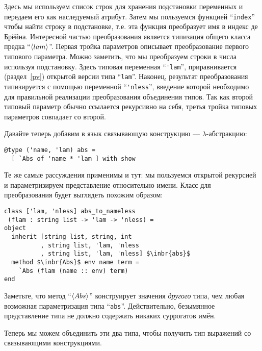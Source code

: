\noindent Здесь мы используем список строк для хранения подстановки переменных и  передаем его как наследуемый атрибут. Затем мы пользуемся функцией 
``\lstinline{index}'' чтобы найти строку в подстановке, т.е.  эта функция преобразует имя в индекс де Брёйна. 
Интересной частью преобразования является типизация общего класса предка ``$\left<lam\right>$''. 
Первая тройка параметров описывает преобразование первого типового параметра. Можно заметить, что мы преобразуем строки в числа используя подстановку.
Здесь типовая переменная ``\lstinline{'lam}'', 
приравнивается (раздел~\ref{pv}) открытой версии типа ``\lstinline{lam}''. %
Наконец, результат преобразования типизируется с помощью переменной ``\lstinline{'nless}'', введение которой необходимо для правильной реализации преобразования объединения типов.
Так как второй типовый параметр обычно ссылается рекурсивно на себя, третья тройка типовых параметров совпадает со второй.

Давайте теперь добавим в язык связывающую конструкцию --- $\lambda$-абстракцию:

\begin{lstlisting}
@type ('name, 'lam) abs = 
  [ `Abs of 'name * 'lam ] with show
\end{lstlisting}

Те же самые рассуждения применимы и тут: мы пользуемся открытой рекурсией и параметризируем представление относительно имени.
Класс для преобразования будет выглядеть похожим образом:

\begin{lstlisting}
class ['lam, 'nless] abs_to_nameless
 (flam : string list -> 'lam -> 'nless) =
object
  inherit [string list, string, int
          , string list, 'lam, 'nless
          , string list, 'lam, 'nless] $\inbr{abs}$
  method $\inbr{Abs}$ env name term = 
    `Abs (flam (name :: env) term)
end
\end{lstlisting}

Заметьте, что метод ``$\left<Abs\right>$'' конструирует значения \emph{другого} типа, чем любая возможная параметризация типа ``\lstinline{abs}''. Действительно, безымянное представление типа не должно содержать никаких суррогатов имён.

Теперь мы можем объединить эти два типа, чтобы получить тип выражений со связывающими конструкциями.

